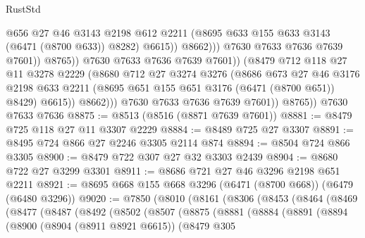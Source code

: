 \begin{lexlean}{RustStd}
\begin{coremodule}
                                      @656
                                      @27
                                      @46
                                      @3143
                                      @2198
                                      @612
                                      @2211
                                      (@8695 @633 @155 @633 @3143 (@6471 (@8700 @633)) @8282)
                                      @6615))
                                  @8662)))
                            @7630
                            @7633
                            @7636
                            @7639
                            @7601))
                        @8765))
                    @7630
                    @7633
                    @7636
                    @7639
                    @7601))
                (@8479
                  @712
                  @118
                  @27
                  @11
                  @3278
                  @2229
                  (@8680
                    @712
                    @27
                    @3274
                    @3276
                    (@8686
                      @673
                      @27
                      @46
                      @3176
                      @2198
                      @633
                      @2211
                      (@8695 @651 @155 @651 @3176 (@6471 (@8700 @651)) @8429)
                      @6615))
                  @8662)))
            @7630
            @7633
            @7636
            @7639
            @7601))
        @8765))
    @7630
    @7633
    @7636
@8875 := @8513 (@8516 (@8871 @7639 @7601))
@8881 := @8479 @725 @118 @27 @11 @3307 @2229
@8884 := @8489 @725 @27 @3307
@8891 := @8495 @724 @866 @27 @2246 @3305 @2114 @874
@8894 := @8504 @724 @866 @3305
@8900 := @8479 @722 @307 @27 @32 @3303 @2439
@8904 := @8680 @722 @27 @3299 @3301
@8911 := @8686 @721 @27 @46 @3296 @2198 @651 @2211
@8921 := @8695 @668 @155 @668 @3296 (@6471 (@8700 @668)) (@6479 (@6480 @3296))
@9020 := @7850
    (@8010
      (@8161
        (@8306
          (@8453
            (@8464
              (@8469
                (@8477
                  (@8487
                    (@8492
                      (@8502
                        (@8507
                          (@8875
                            (@8881
                              (@8884
                                (@8891
                                  (@8894
                                    (@8900
                                      (@8904 (@8911 @8921 @6615))
                                      (@8479
                                        @305

\end{coremodule}
\end{lexlean}
